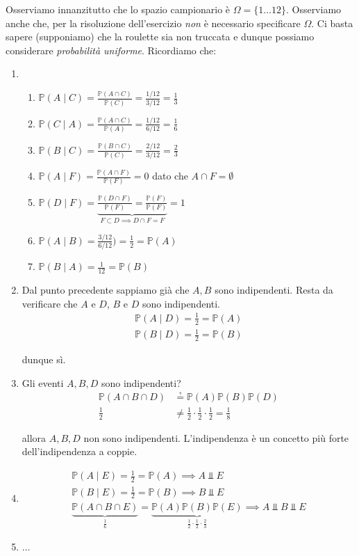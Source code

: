 Osserviamo innanzitutto che lo spazio campionario è $\Omega =\{1\dotsc 12\}$. Osserviamo anche che, per la risoluzione dell'esercizio \textit{non} è necessario specificare $\Omega $. Ci basta sapere (supponiamo) che la roulette sia non truccata e dunque possiamo considerare \textit{probabilità uniforme}. Ricordiamo che:
\begin{enumerate}
\item 
\begin{enumerate}
\item $\mathbb{P}( A\mid C) =\frac{\mathbb{P}( A\cap C)}{\mathbb{P}( C)} =\frac{1/12}{3/12} =\frac{1}{3}$
\item $\mathbb{P}( C\mid A) =\frac{\mathbb{P}( A\cap C)}{\mathbb{P}( A)} =\frac{1/12}{6/12} =\frac{1}{6}$
\item $\mathbb{P}( B\mid C) =\frac{\mathbb{P}( B\cap C)}{\mathbb{P}( C)} =\frac{2/12}{3/12} =\frac{2}{3}$
\item $\mathbb{P}( A\mid F) =\frac{\mathbb{P}( A\cap F)}{\mathbb{P}( F)} =0$ dato che $A\cap F=\emptyset $
\item $\mathbb{P}( D\mid F) =\underbrace{\frac{\mathbb{P}( D\cap F)}{\mathbb{P}( F)} =\frac{\mathbb{P}( F)}{\mathbb{P}( F)}}_{F\subset D\implies D\cap F=F} =1$
\item $\mathbb{P}( A\mid B) =\frac{3/12}{6/12}) =\frac{1}{2} =\mathbb{P}( A)$
\item $\mathbb{P}( B\mid A) =\frac{1}{12} =\mathbb{P}( B)$
\end{enumerate}
\item Dal punto precedente sappiamo già che $A,B$ sono indipendenti. Resta da verificare che $A$ e $D$, $B$ e $D$ sono indipendenti.\begin{gather*}
\mathbb{P}( A\mid D) =\frac{1}{2} =\mathbb{P}( A)\\
\mathbb{P}( B\mid D) =\frac{1}{2} =\mathbb{P}( B)
\end{gather*}

dunque sì.
\item Gli eventi $A,B,D$ sono indipendenti?\begin{equation*}
\begin{aligned}
\mathbb{P}( A\cap B\cap D) & \questeq \mathbb{P}( A)\mathbb{P}( B)\mathbb{P}( D)\\
\frac{1}{2} & \neq \frac{1}{2} \cdotp \frac{1}{2} \cdotp \frac{1}{2} =\frac{1}{8}
\end{aligned}
\end{equation*}

allora $A,B,D$ non sono indipendenti. L'indipendenza è un concetto più forte dell'indipendenza a coppie.
\item \begin{gather*}
\mathbb{P}( A\mid E) =\frac{1}{2} =\mathbb{P}( A) \implies A\Bot E\\
\mathbb{P}( B\mid E) =\frac{1}{2} =\mathbb{P}( B) \implies B\Bot E\\
\underbrace{\mathbb{P}( A\cap B\cap E)}_{\frac{1}{6}} =\underbrace{\mathbb{P}( A)\mathbb{P}( B)\mathbb{P}( E)}_{\frac{1}{2} \cdotp \frac{1}{2} \cdotp \frac{2}{3}} \implies A\Bot B\Bot E
\end{gather*}
\item $\dotsc $
\end{enumerate}

